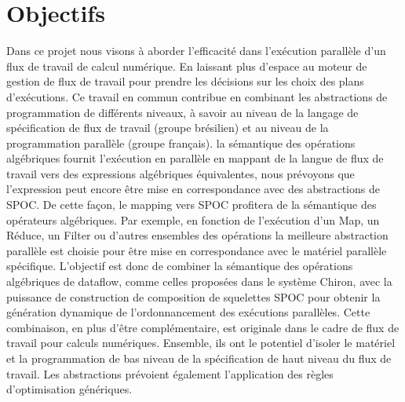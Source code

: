 

\vspace{0.5cm}
\section{Objectifs}




Dans ce projet nous visons à aborder l'efficacité dans l'exécution parallèle d'un flux de travail de calcul numérique. En laissant plus d'espace au moteur de gestion de flux de travail pour prendre les décisions sur les choix des plans d'exécutions. %
Ce travail en commun contribue en combinant les abstractions de programmation de différents niveaux, à savoir au niveau de la langage de spécification de flux de travail (groupe brésilien) et au niveau de la programmation parallèle (groupe français). la sémantique des opérations algébriques fournit l'exécution en parallèle en mappant de la langue de flux de travail vers des expressions algébriques équivalentes, nous prévoyons que l'expression peut encore être mise en correspondance avec des abstractions de SPOC. De cette façon, le mapping vers SPOC profitera de la sémantique des opérateurs algébriques. Par exemple, en fonction de l'exécution d'un Map, un Réduce, un Filter ou d'autres ensembles des opérations la meilleure abstraction parallèle est choisie pour être mise en correspondance avec le matériel parallèle spécifique.
L'objectif est donc de combiner la sémantique des opérations algébriques de dataflow, comme celles proposées dans le système Chiron, avec la puissance de construction de composition de squelettes SPOC pour obtenir la génération dynamique de l'ordonnancement des exécutions parallèles. 
Cette combinaison, en plus d'être complémentaire, est originale dans le cadre de flux de travail pour calculs numériques. Ensemble, ils ont le potentiel d'isoler le matériel et la programmation de bas niveau de la spécification de haut niveau du flux de travail. Les abstractions prévoient également l'application des règles d'optimisation génériques.

